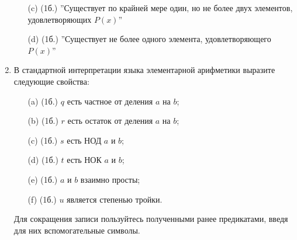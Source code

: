 \begin{enumerate}
\begin{itemize}
\begin{solution}
        \end{solution}
        \item[(c)] (1б.) ”Существует по крайней мере один, но не более двух элементов, удовлетворяющих $P(x)$”
        \item[(d)] (1б.) ”Существует не более одного элемента, удовлетворяющего $P(x)$”
    \end{itemize}
    \item В стандартной интерпретации языка элементарной арифметики выразите следующие свойства:
    \begin{itemize}
        \item[(a)] (1б.) $q$ есть частное от деления $a$ на $b$;
        \item[(b)] (1б.) $r$ есть остаток от деления $a$ на $b$;
        \item[(c)] (1б.) $s$ есть НОД $a$ и $b$;
        \item[(d)] (1б.) $t$ есть НОК $a$ и $b$;
        \item[(e)] (1б.) $a$ и $b$ взаимно просты;
        \item[(f)] (1б.) $u$ является степенью тройки.
    \end{itemize}
    Для сокращения записи пользуйтесь полученными ранее предикатами, введя для них вспомогательные символы.
    
\end{enumerate}
\clearpage
